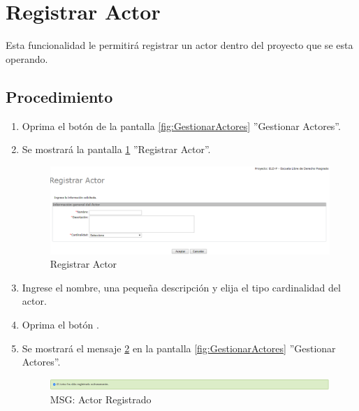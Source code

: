 
\hypertarget{cv:registrarActor}{\section{Registrar Actor}} \label{sec:registrarActor}

	Esta funcionalidad le permitirá registrar un actor dentro del proyecto que se esta operando. 

		\subsection{Procedimiento}

			\begin{enumerate}
	
			\item Oprima el botón \IURegistrar{} de la pantalla \ref{fig:GestionarActores} ''Gestionar Actores''.
			
			\item Se mostrará la pantalla \ref{fig:registrarActor} ''Registrar Actor''.

			\begin{figure}[H]
				\begin{center}
					\includegraphics[scale=0.5]{roles/lider/actor/pantallas/IU10-1registrarActor}
					\caption{Registrar Actor}
					\label{fig:registrarActor}
				\end{center}
			\end{figure}
		
			\item Ingrese el nombre, una pequeña descripción y elija el tipo cardinalidad del actor.
			
			\item Oprima el botón \IUAceptar.
			
			\item Se mostrará el mensaje \ref{fig:actorRegistrado} en la pantalla \ref{fig:GestionarActores} ''Gestionar Actores''.
			
			\begin{figure}[htbp!]
				\begin{center}
					\includegraphics[scale=0.5]{roles/lider/actor/pantallas/IU10-1MSG1}
					\caption{MSG: Actor Registrado}
					\label{fig:actorRegistrado}
				\end{center}
			\end{figure}
			\end{enumerate}